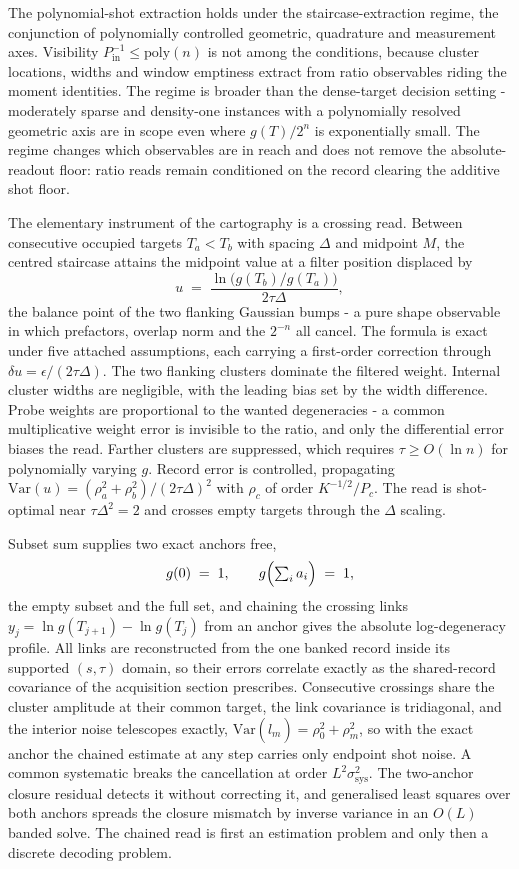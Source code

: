 The polynomial-shot extraction holds under the staircase-extraction regime, the conjunction of polynomially controlled geometric, quadrature and measurement axes. Visibility $P_{\mathrm{in}}^{-1} \le \mathrm{poly}(n)$ is not among the conditions, because cluster locations, widths and window emptiness extract from ratio observables riding the moment identities. The regime is broader than the dense-target decision setting - moderately sparse and density-one instances with a polynomially resolved geometric axis are in scope even where $g(T)/2^n$ is exponentially small. The regime changes which observables are in reach and does not remove the absolute-readout floor: ratio reads remain conditioned on the record clearing the additive shot floor.

The elementary instrument of the cartography is a crossing read. Between consecutive occupied targets $T_a < T_b$ with spacing $\Delta$ and midpoint $M$, the centred staircase attains the midpoint value at a filter position displaced by
\[
u \;=\; \frac{\ln\bigl(g(T_b)/g(T_a)\bigr)}{2\tau\Delta},
\]
the balance point of the two flanking Gaussian bumps - a pure shape observable in which prefactors, overlap norm and the $2^{-n}$ all cancel. The formula is exact under five attached assumptions, each carrying a first-order correction through $\delta u = \epsilon/(2\tau\Delta)$. The two flanking clusters dominate the filtered weight. Internal cluster widths are negligible, with the leading bias set by the width difference. Probe weights are proportional to the wanted degeneracies - a common multiplicative weight error is invisible to the ratio, and only the differential error biases the read. Farther clusters are suppressed, which requires $\tau \ge O(\ln n)$ for polynomially varying $g$. Record error is controlled, propagating $\mathrm{Var}(u) = (\rho_a^2 + \rho_b^2)/(2\tau\Delta)^2$ with $\rho_c$ of order $K^{-1/2}/P_c$. The read is shot-optimal near $\tau\Delta^2 = 2$ and crosses empty targets through the $\Delta$ scaling.

Subset sum supplies two exact anchors free,
\[
g(0) \;=\; 1, \qquad g\Bigl(\textstyle\sum_i a_i\Bigr) \;=\; 1,
\]
the empty subset and the full set, and chaining the crossing links $y_j = \ln g(T_{j+1}) - \ln g(T_j)$ from an anchor gives the absolute log-degeneracy profile. All links are reconstructed from the one banked record inside its supported $(s, \tau)$ domain, so their errors correlate exactly as the shared-record covariance of the acquisition section prescribes. Consecutive crossings share the cluster amplitude at their common target, the link covariance is tridiagonal, and the interior noise telescopes exactly, $\mathrm{Var}(\hat{l}_m) = \rho_0^2 + \rho_m^2$, so with the exact anchor the chained estimate at any step carries only endpoint shot noise. A common systematic breaks the cancellation at order $L^2 \sigma_{\mathrm{sys}}^2$. The two-anchor closure residual detects it without correcting it, and generalised least squares over both anchors spreads the closure mismatch by inverse variance in an $O(L)$ banded solve. The chained read is first an estimation problem and only then a discrete decoding problem.

